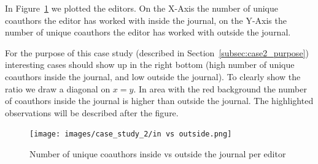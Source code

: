 \documentclass{ou-report}
\begin{document}






In Figure~\ref{fig:editors_in_out_journal} we plotted the editors.
On the X-Axis
the number of unique coauthors the editor has worked with inside the journal, on 
the Y-Axis the number of unique coauthors the editor has worked with outside the 
journal. 

For the purpose of this case study (described in 
Section~\ref{subsec:case2_purpose}) interesting cases should show up in the right 
bottom (high number of unique coauthors inside the journal, and low outside the 
journal).
To clearly show the ratio we draw a diagonal on \(x = y\). In area with the red 
background the number of coauthors inside the journal is higher than outside the 
journal.
The highlighted observations will be described after the figure.

\begin{figure}
    \centering
    \texttt{[image: images/case\_study\_2/in vs outside.png]}
    \caption{Number of unique coauthors inside vs outside the journal per editor}
    \label{fig:editors_in_out_journal}
\end{figure}

\end{document}
